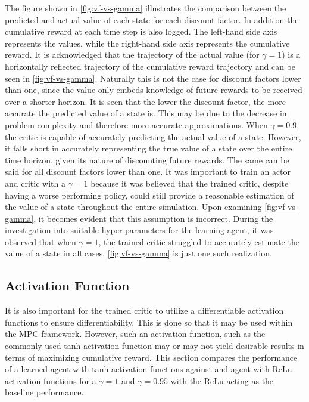The figure shown in \autoref{fig:vf-vs-gamma}  illustrates the comparison between the predicted and actual value of each state for each discount factor. In addition the cumulative reward at each time step is also logged. The left-hand side axis represents the values, while the right-hand side axis represents the cumulative reward. It is acknowledged that the trajectory of the actual value  (for $\gamma = 1$) is a horizontally reflected trajectory of the cumulative reward trajectory and can be seen in \autoref{fig:vf-vs-gamma}. Naturally this is not the case for discount factors lower than one, since the value only embeds knowledge of future rewards to be received over a shorter horizon. It is seen that the lower the discount factor, the more accurate the predicted value of a state is. This may be due to the decrease in problem complexity and therefore more accurate approximations. When $\gamma = 0.9$, the critic is capable of accurately predicting the actual value of a state. However, it falls short in accurately representing the true value of a state over the entire time horizon, given its nature of discounting future rewards. The same can be said for all discount factors lower than one. It was important to train an actor and critic with a $\gamma = 1$ because it was believed that the trained critic, despite having a worse performing policy,  could still provide a reasonable estimation of the value of a state throughout the entire simulation. Upon examining \autoref{fig:vf-vs-gamma}, it becomes evident that this assumption is incorrect. During the investigation into suitable hyper-parameters for the learning agent, it was observed that when $\gamma = 1$, the trained critic struggled to accurately estimate the value of a state in all cases. \autoref{fig:vf-vs-gamma} is just one such realization. 

\subsection{Activation Function}
It is also important for the trained critic to utilize a differentiable activation functions to ensure differentiability. This is done so that it may be used within the MPC framework. However, such an activation function, such as the commonly used tanh activation function may or may not yield desirable results in terms of maximizing cumulative reward. This section compares the performance of a learned agent with tanh activation functions against and agent with ReLu activation functions for a $\gamma = 1$ and $\gamma = 0.95$ with the ReLu acting as the baseline performance. 


